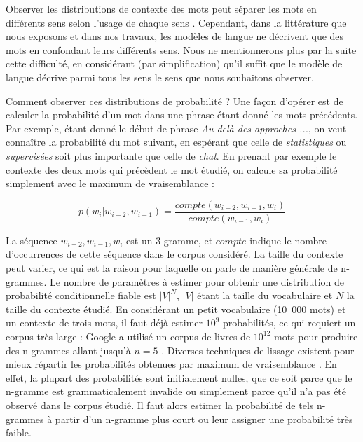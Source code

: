 Observer les distributions de contexte des mots peut séparer les mots en
différents sens selon l'usage de chaque sens
\citep{yarowsky1993one,pantel2002discovering,pedersen2010duluth}. Cependant,
dans la littérature que nous exposons et dans nos travaux, les modèles de
langue ne décrivent que des mots en confondant leurs différents sens. Nous ne
mentionnerons plus par la suite cette difficulté, en considérant (par
simplification) qu'il suffit que le modèle de langue décrive parmi tous les
sens le sens que nous souhaitons observer.

Comment observer ces distributions de probabilité ? Une façon d'opérer est de
calculer la probabilité d'un mot dans une phrase étant donné les mots
précédents. Par exemple, étant donné le début de phrase \emph{Au-delà des
approches ...}, on veut connaître la probabilité du mot suivant, en espérant
que celle de \emph{statistiques} ou \emph{supervisées} soit plus importante que
celle de \emph{chat}. En prenant par exemple le contexte des deux mots qui
précèdent le mot étudié, on calcule sa probabilité simplement avec le maximum
de vraisemblance :

\[
p(w_i|w_{i-2}, w_{i-1}) = \frac{compte(w_{i-2}, w_{i-1}, w_i)}{compte(w_{i-1}, w_i)}
\]

La séquence $w_{i-2}, w_{i-1}, w_{i}$ est un 3-gramme, et $compte$ indique le
nombre d'occurrences de cette séquence dans le corpus considéré. La taille du
contexte peut varier, ce qui est la raison pour laquelle on parle de manière
générale de n-grammes. Le nombre de paramètres à estimer pour obtenir une
distribution de probabilité conditionnelle fiable est $|V|^N$, $|V|$ étant la
taille du vocabulaire et $N$ la taille du contexte étudié. En considérant un
petit vocabulaire (10~000 mots) et un contexte de trois mots, il faut déjà
estimer $10^{9}$ probabilités, ce qui requiert un corpus très large : Google a
utilisé un corpus de livres de $10^{12}$ mots pour produire des n-grammes
allant jusqu'à $n=5$ \citep{brants2006web}. Diverses techniques de lissage
existent pour mieux répartir les probabilités obtenues par maximum de
vraisemblance \citep[Chapitre~4]{jurafsky2008speech}. En effet, la plupart des
probabilités sont initialement nulles, que ce soit parce que le n-gramme est
grammaticalement invalide ou simplement parce qu'il n'a pas été observé dans le
corpus étudié. Il faut alors estimer la probabilité de tels n-grammes à partir
d'un n-gramme plus court ou leur assigner une probabilité très faible.

